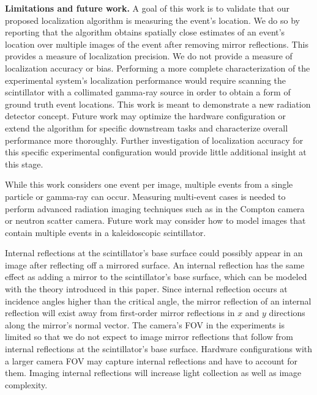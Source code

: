 \noindent
\textbf{Limitations and future work.}
A goal of this work is to validate that our proposed localization algorithm is 
measuring the event's location.
We do so by reporting that the algorithm obtains spatially close estimates of an 
event's location over multiple images of the event after removing mirror reflections.
This provides a measure of localization precision.
We do not provide a measure of localization accuracy or bias.
Performing a more complete characterization of the experimental system's 
localization performance would require scanning the scintillator with a collimated 
gamma-ray source in order to obtain a form of ground truth event locations.
This work is meant to demonstrate a new radiation detector concept.
Future work may optimize the hardware configuration or extend the algorithm for 
specific downstream tasks and characterize overall performance more thoroughly.
Further investigation of localization accuracy for this specific experimental 
configuration would provide little additional insight at this stage.

While this work considers one event per image, multiple events from a single 
particle or gamma-ray can occur. 
Measuring multi-event cases is needed to perform advanced radiation imaging 
techniques such as in the Compton camera or neutron scatter camera.
Future work may consider how to model images that contain multiple events in a 
kaleidoscopic scintillator.

Internal reflections at the scintillator's base surface could possibly 
appear in an image after reflecting off a mirrored surface.
An internal reflection has the same effect as adding a mirror to the 
scintillator's base surface, which can be modeled with the theory introduced in 
this paper.
Since internal reflection occurs at incidence angles higher than the critical 
angle, the mirror reflection of an internal reflection will exist away from 
first-order mirror reflections in $x$ and $y$ directions along the mirror's normal vector.
The camera's FOV in the experiments is limited so that we do not 
expect to image mirror reflections that follow from internal reflections at the 
scintillator's base surface.
Hardware configurations with a larger camera FOV may capture internal reflections 
and have to account for them.
Imaging internal reflections will increase light collection as well as image complexity.


